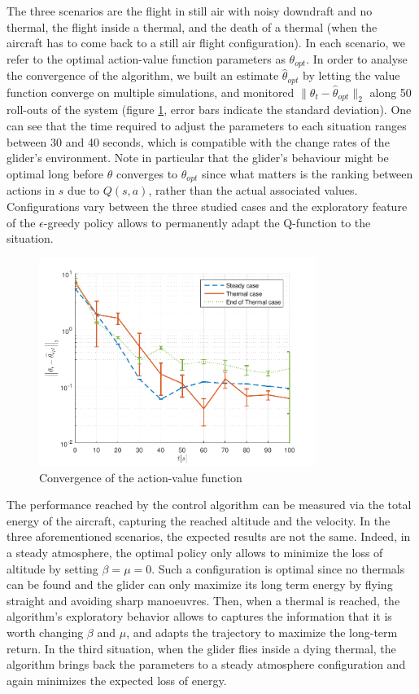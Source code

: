 \documentclass{ifacconf}
\begin{document}
The three scenarios are the flight in still air with noisy downdraft and no thermal, the flight inside a thermal, and the death of a thermal (when the aircraft has to come back to a still air flight configuration).
In each scenario, we refer to the optimal action-value function parameters as $\theta_{opt}$.
In order to analyse the convergence of the algorithm, we built an estimate $\widehat{\theta}_{opt}$ by letting the value function converge on multiple simulations, and monitored $\|\theta_t - \widehat{\theta}_{opt}\|_2$ along 50 roll-outs of the system (figure \ref{fig:param_cv}, error bars indicate the standard deviation). One can see that the time required to adjust the parameters to each situation ranges between 30 and 40 seconds, which is compatible with the change rates of the glider's environment. Note in particular that the glider's behaviour might be optimal long before $\theta$ converges to $\theta_{opt}$ since what matters is the ranking between actions in $s$ due to $Q(s,a)$, rather than the actual associated values. Configurations vary between the three studied cases and the exploratory feature of the $\epsilon$-greedy policy allows to permanently adapt the Q-function to the situation.

\begin{figure}
\begin{center}
 \includegraphics[width=9cm]{img/cv_speed.pdf}
\end{center}
\caption{Convergence of the action-value function}
\label{fig:param_cv}
\end{figure}

The performance reached by the control algorithm can be measured via the total energy of the aircraft, capturing the reached altitude and the velocity. In the three aforementioned scenarios, the expected results are not the same. Indeed, in a steady atmosphere, the optimal policy only allows to minimize the loss of altitude by setting $\beta = \mu = 0$. Such a configuration is optimal since no thermals can be found and the glider can only maximize its long term energy by flying straight and avoiding sharp manoeuvres. Then, when a thermal is reached, the algorithm's exploratory behavior allows to captures the information that it is worth changing $\beta$ and $\mu$, and adapts the trajectory to maximize the long-term return. In the third situation, when the glider flies inside a dying thermal, the algorithm brings back the parameters to a steady atmosphere configuration and again minimizes the expected loss of energy.
\end{document}
